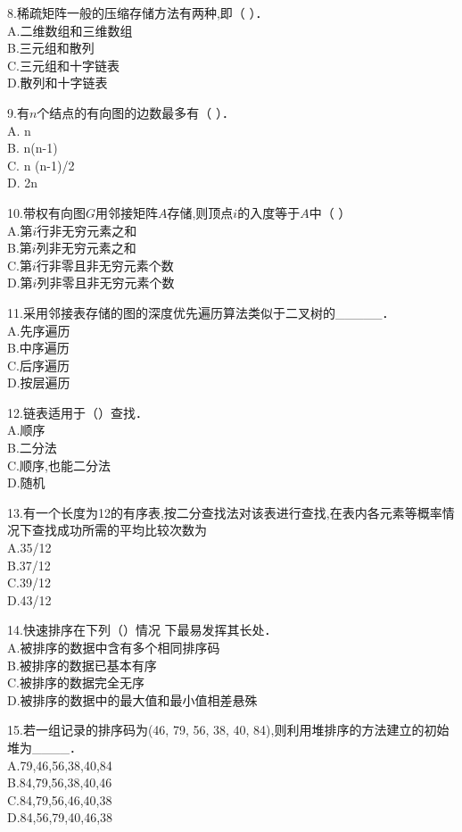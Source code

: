 8.稀疏矩阵一般的压缩存储方法有两种,即（    ）． \\
A.二维数组和三维数组 \\
B.三元组和散列 \\
C.三元组和十字链表 \\
D.散列和十字链表

9.有$n$个结点的有向图的边数最多有（    ）． \\
A. n \\
B. n(n-1) \\
C. n (n-1)/2 \\
D. 2n

10.带权有向图$G$用邻接矩阵$A$存储,则顶点$i$的入度等于$A$中（    ） \\
A.第$i$行非无穷元素之和 \\
B.第$i$列非无穷元素之和 \\
C.第$i$行非零且非无穷元素个数 \\
D.第$i$列非零且非无穷元素个数

11.采用邻接表存储的图的深度优先遍历算法类似于二叉树的_____． \\
A.先序遍历 \\
B.中序遍历 \\
C.后序遍历 \\
D.按层遍历

12.链表适用于（）查找． \\
A.顺序 \\
B.二分法 \\
C.顺序,也能二分法 \\
D.随机

13.有一个长度为12的有序表,按二分查找法对该表进行查找,在表内各元素等概率情况下查找成功所需的平均比较次数为 \\
A.35/12 \\
B.37/12 \\
C.39/12 \\
D.43/12

14.快速排序在下列（）情况 下最易发挥其长处． \\
A.被排序的数据中含有多个相同排序码 \\
B.被排序的数据已基本有序 \\
C.被排序的数据完全无序 \\
D.被排序的数据中的最大值和最小值相差悬殊

15.若一组记录的排序码为(46, 79, 56, 38, 40, 84),则利用堆排序的方法建立的初始堆为____． \\
A.79,46,56,38,40,84 \\
B.84,79,56,38,40,46 \\
C.84,79,56,46,40,38 \\
D.84,56,79,40,46,38

